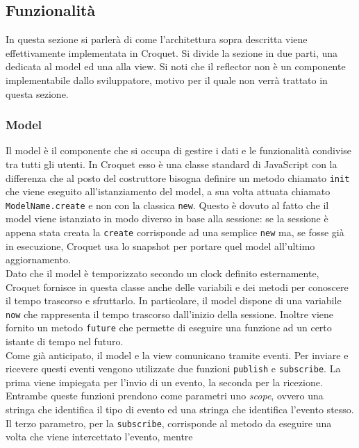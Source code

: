 \subsection{Funzionalità}\label{subsec:Croquet_funzionalita}
In questa sezione si parlerà di come l'architettura sopra descritta viene effettivamente implementata in Croquet. Si divide la sezione in due parti, una dedicata al model ed una alla
view. Si noti che il reflector non è un componente implementabile dallo sviluppatore, motivo per il quale non verrà trattato in questa sezione.\\
\subsubsection{Model}\label{subsubsec:Croquet_model}
Il model è il componente che si occupa di gestire i dati e le funzionalità condivise tra tutti gli utenti. In Croquet esso è una classe standard di JavaScript con la differenza
che al posto del costruttore bisogna definire un metodo chiamato \texttt{init} che viene eseguito all'istanziamento del model, a sua volta attuata chiamato \texttt{ModelName.create}
e non con la classica \texttt{new}. Questo è dovuto al fatto che il model viene istanziato in modo diverso in base alla sessione: se la sessione è appena stata creata la \texttt{create}
corrisponde ad una semplice \texttt{new} ma, se fosse già in esecuzione, Croquet usa lo snapshot per portare quel model all'ultimo aggiornamento.\\
\newline
Dato che il model è temporizzato secondo un clock definito esternamente, Croquet fornisce in questa classe anche delle variabili e dei metodi per conoscere il tempo trascorso e 
sfruttarlo. In particolare, il model dispone di una variabile \texttt{now} che rappresenta il tempo trascorso dall'inizio della sessione. Inoltre viene fornito un metodo \texttt{future}
che permette di eseguire una funzione ad un certo istante di tempo nel futuro.\\
\newline
Come già anticipato, il model e la view comunicano tramite eventi. Per inviare e ricevere questi eventi vengono utilizzate due funzioni \texttt{publish} e \texttt{subscribe}. La prima
viene impiegata per l'invio di un evento, la seconda per la ricezione. Entrambe queste funzioni prendono come parametri uno \textit{scope}, ovvero una stringa che identifica il tipo di
evento ed una stringa che identifica l'evento stesso. Il terzo parametro, per la \texttt{subscribe}, corrisponde al metodo da eseguire una volta che viene intercettato l'evento, mentre
